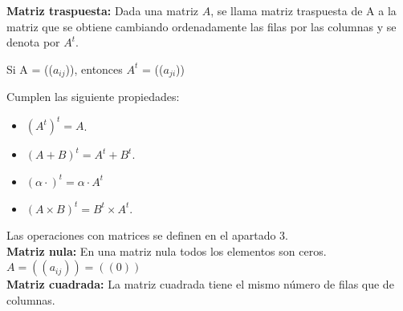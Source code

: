 \documentclass[10pt]{article}
\begin{document}
\textbf{Matriz traspuesta:} Dada una matriz $A$, se llama matriz traspuesta de A a la matriz que se obtiene cambiando ordenadamente las filas por las columnas y se denota por $A^t$.

Si A = (($a_{ij}$)), entonces $A^t$ = (($a_{ji}$))

Cumplen las siguiente propiedades:

\begin{itemize}
\item $(A^t)^t = A$.
\item $(A + B)^t = A^t + B^t$.
\item $(\alpha \cdot )^t = \alpha \cdot {A^t}$
\item $(A\times B)^t = B^t\times A^t$.
\end{itemize}
Las operaciones con matrices se definen en el apartado 3. \\


\textbf{Matriz nula:} En una matriz nula todos los elementos son ceros. $A = ((a_{ij})) = ((0))$ \\

\textbf{Matriz cuadrada:} La matriz cuadrada tiene el mismo número de filas que de columnas.
\end{document}
